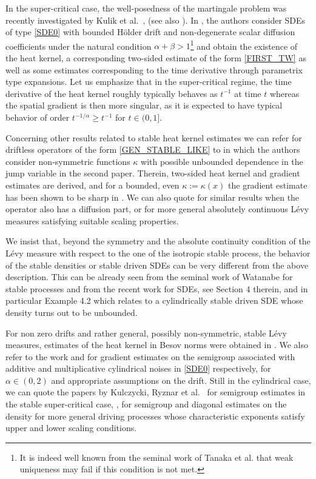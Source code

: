 \documentclass[JEP,XML,SOM,Unicode,published]{cedram}
\theoremstyle{plain}
\theoremstyle{definition}
\newcommand\1{{\mathbf{1}}}
\begin{document}
In the super-critical case, the well-posedness of the martingale problem was recently investigated by
Kulik et al.\ \cite{knop:kuli:18}, \cite{kuli:19} (see also \cite{CZZ}).
In \cite{kuli:19},
the authors consider SDEs of type \eqref{SDE0} with bounded Hölder drift and non-degenerate scalar diffusion coefficients under the natural condition $\alpha+\beta>1 $\footnote{It is indeed well known from the seminal work of Tanaka et al. \cite{tana:tsuc:wata:74} that weak uniqueness may fail if this condition is not met.} and obtain the existence of the heat kernel,
a corresponding two-sided estimate of the form \eqref{FIRST_TW} as well as some estimates corresponding to the time derivative through parametrix type expansions. Let us emphasize that in the super-critical regime, the time derivative of the heat kernel roughly typically behaves as $t^{-1}$ at time $t$ whereas the spatial gradient is then more singular, as it is expected to have typical behavior of order $t^{-1/\alpha}\ge t^{-1} $ for $t\in (0,1] $.

{Concerning other results related to stable heat kernel estimates we can refer \eg for driftless operators
of the form \eqref{GEN_STABLE_LIKE} to \cite{Ch-Zh}
\cite{Ch-Zh1} in which the authors consider non-symmetric functions $\kappa$ with possible unbounded dependence in the jump variable in the second paper. Therein, two-sided heat kernel and gradient estimates are derived, and for a bounded, even $\kappa:=\kappa(x) $ the gradient estimate has been shown to be sharp in \cite{DZ}. We can also quote \cite{CHXZ} for similar results when the operator also has a diffusion part, or \cite{Ch-Zh20} for more general absolutely continuous Lévy measures satisfying suitable scaling properties.
}


{We insist that, beyond the symmetry and the absolute continuity condition of the Lévy measure with respect to the one of the isotropic stable process, the behavior of the stable densities or stable driven SDEs can be very different from the above description. This can be 	already seen from the seminal work of Watanabe \cite{wata:07} for stable processes and from the recent work \cite{knop:kuli:schi:20} for SDEs, see Section 4 therein, and in particular Example 4.2 which relates to a cylindrically stable driven SDE whose density turns out to be unbounded.
}

{
For non zero drifts and rather general, possibly non-symmetric, stable Lévy measures, estimates of the heat kernel in Besov norms were obtained in \cite{De-Fo}.
We also refer to the work \cite{kuli:pesz:prio:20} and \cite{CHZ} for gradient estimates on the semigroup associated
with additive and multiplicative cylindrical noises in \eqref{SDE0} respectively, for $\alpha\in (0,2) $ and appropriate assumptions on the drift. Still in the cylindrical case, we can quote the papers by Kulczycki, Ryznar et al.\ \cite{kulc:ryzn:szto:21} for semigroup estimates in the stable super-critical case, \cite{kulc:ryzn:19}, \cite{kulc:kuli:ryzn:21} for semigroup and diagonal estimates on the density for more general driving processes whose characteristic exponents satisfy upper and lower scaling conditions.
}
\end{document}
